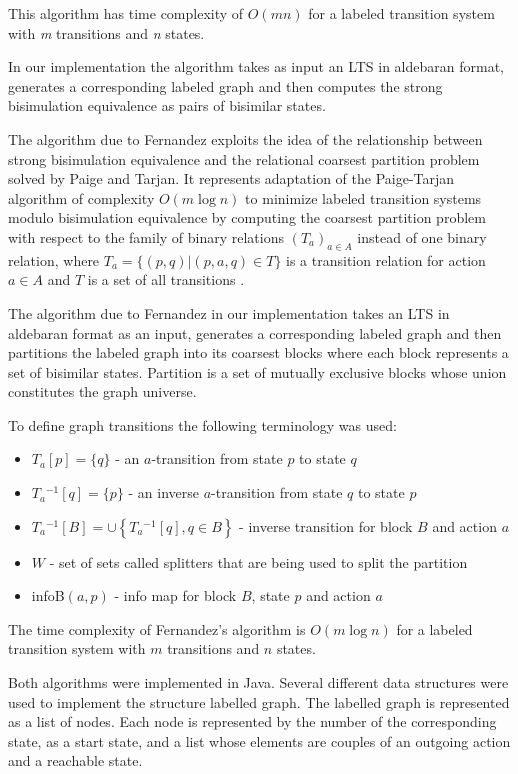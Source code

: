 This algorithm has time complexity of $O(mn)$ for a labeled transition system with
\emph{m} transitions and \emph{n} states. 

In our implementation the algorithm takes as input an LTS in aldebaran format, generates a corresponding labeled 
graph and then computes the strong bisimulation equivalence as pairs of bisimilar states.

The algorithm due to Fernandez exploits the idea of the relationship between strong bisimulation equivalence 
and the relational coarsest partition problem solved by Paige and Tarjan. It represents adaptation of the 
Paige-Tarjan algorithm of complexity $O(m \log n)$ to minimize labeled transition systems modulo bisimulation 
equivalence by computing the coarsest partition problem with respect to the family of binary relations 
$\left(T_a\right)_{a\in A}$ instead of one binary relation, where $T_a=\{(p,q)|(p,a,q)\in T\}$ is a transition 
relation for action ${a\in A}$ and $T$ is a set of all transitions \cite{PaigeTarjan, Fernandez}.

The algorithm due to Fernandez in our implementation takes an LTS in aldebaran format as an input, generates a 
corresponding labeled graph and then partitions the labeled graph into its coarsest blocks where each block represents 
a set of bisimilar states. Partition is a set of mutually exclusive blocks whose union constitutes the graph universe.

To define graph transitions the following terminology was used: 

\begin{itemize}
	\item $T_a[p]=\{q\}$ - an $a$-transition from state $p$ to state $q$
	\item $T_a{}^{-1}[q]=\{p\}$ - an inverse $a$-transition from state $q$ to state $p$
	\item $T_a{}^{-1}[B]=\cup \left\{T_a{}^{-1}[q],q\in B\right\}$ - inverse transition for block $B$ and action $a$
	\item $W$ - set of sets called splitters that are being used to split the partition
	\item infoB$(a, p)$ - info map for block $B$, state $p$ and action $a$
\end{itemize}

The time complexity of Fernandez's algorithm is $O(m \log n)$ for a labeled transition system 
with $m$ transitions and $n$ states. 

Both algorithms were implemented in Java. Several different data structures were used to implement the structure
labelled graph. The labelled graph is represented as a list of nodes. Each node is represented by the number of the
corresponding state, as a start state, and a list whose elements are couples of an outgoing action and a reachable 
state. 

